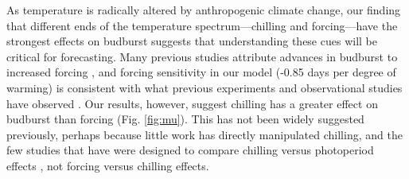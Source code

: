 \documentclass{article}
\begin{document}

\par As temperature is radically altered by anthropogenic climate change, our finding that different ends of the temperature spectrum---chilling and forcing---have the strongest effects on budburst suggests that understanding these cues will be critical for forecasting. Many previous studies attribute advances in budburst to increased forcing \citep{Basler:2014aa,bradley1999,menzel2006,harrington2015}, and forcing sensitivity in our model (-0.85 days per degree of warming) is consistent with what previous experiments and observational studies have observed \citep{wolkovich2012,menzel2006}. Our results, however, suggest chilling has a greater effect on budburst than forcing (Fig. \ref{fig:mu}). This has not been widely suggested previously, perhaps because little work has directly manipulated chilling, and the few studies that have were designed to compare chilling versus photoperiod effects \citep[e.g., ][]{Basler:2014aa,Caffarra:2011qf,Laube:2014a,zohner2016}, not forcing versus chilling effects. 
\end{document}
